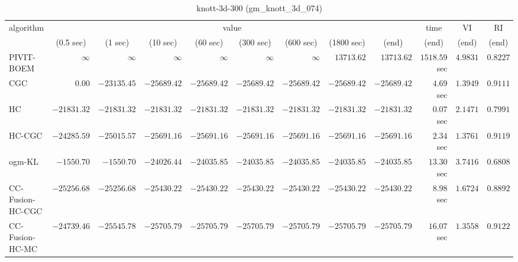 \begin{table}[H]
\scriptsize
\centering
\caption{knott-3d-300 (gm\_knott\_3d\_074)}
\label{tab:anytimetable-knott-3d-300-gm-knott-3d-074}
\begin{tabular}{lrrrrrrrrrrr}
\toprule
           algorithm &                                   \multicolumn{8}{c}{value} & \multicolumn{1}{c}{time}    & \multicolumn{1}{c}{VI}  & \multicolumn{1}{c}{RI} \\  
\cmidrule(lr){2-9}\cmidrule(lr){10-10} \cmidrule(lr){11-11} \cmidrule(lr){12-12}   
                     & \multicolumn{1}{c}{(0.5 sec)} & \multicolumn{1}{c}{(1 sec)} & \multicolumn{1}{c}{(10 sec)} & \multicolumn{1}{c}{(60 sec)} & \multicolumn{1}{c}{(300 sec)} & \multicolumn{1}{c}{(600 sec)} & \multicolumn{1}{c}{(1800 sec)} & \multicolumn{1}{c}{(end)} & \multicolumn{1}{c}{(end)}    & \multicolumn{1}{c}{(end)}   & \multicolumn{1}{c}{(end)}  \\ \midrule 
          PIVIT-BOEM & $\infty$ & $\infty$ & $\infty$ & $\infty$ & $\infty$ & $\infty$ & $     13713.62$ & $     13713.62$ & $      1518.59$ sec    & $       4.9831$  & $       0.8227$ \\ 
                 CGC & $         0.00$ & $    -23135.45$ & $    -25689.42$ & $    -25689.42$ & $    -25689.42$ & $    -25689.42$ & $    -25689.42$ & $    -25689.42$ & $         4.69$ sec    & $       1.3949$  & $       0.9111$ \\ 
                  HC & $    -21831.32$ & $    -21831.32$ & $    -21831.32$ & $    -21831.32$ & $    -21831.32$ & $    -21831.32$ & $    -21831.32$ & $    -21831.32$ & $         0.07$ sec    & $       2.1471$  & $       0.7991$ \\ 
              HC-CGC & $    -24285.59$ & $    -25015.57$ & $    -25691.16$ & $    -25691.16$ & $    -25691.16$ & $    -25691.16$ & $    -25691.16$ & $    -25691.16$ & $         2.34$ sec    & $       1.3761$  & $       0.9119$ \\ 
              ogm-KL & $     -1550.70$ & $     -1550.70$ & $    -24026.44$ & $    -24035.85$ & $    -24035.85$ & $    -24035.85$ & $    -24035.85$ & $    -24035.85$ & $        13.30$ sec    & $       3.7416$  & $       0.6808$ \\ 
    CC-Fusion-HC-CGC & $    -25256.68$ & $    -25256.68$ & $    -25430.22$ & $    -25430.22$ & $    -25430.22$ & $    -25430.22$ & $    -25430.22$ & $    -25430.22$ & $         8.98$ sec    & $       1.6724$  & $       0.8892$ \\ 
     CC-Fusion-HC-MC & $    -24739.46$ & $    -25545.78$ & $    -25705.79$ & $    -25705.79$ & $    -25705.79$ & $    -25705.79$ & $    -25705.79$ & $    -25705.79$ & $        16.07$ sec    & $       1.3558$  & $       0.9122$ \\ 

\end{tabular}
\end{table}
